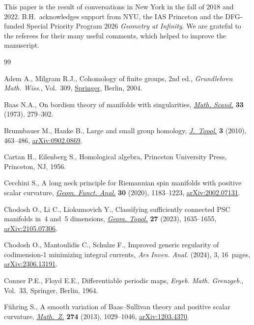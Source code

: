\documentclass[10pt,a4paper]{amsart}
\numberwithin{equation}{section}
\begin{document}
This paper is the result of conversations in New York in the fall of 2018 and 2022.
B.H.~acknowledges support from NYU, the IAS Princeton and the DFG-funded Special Priority Program 2026 {\em Geometry at Infinity}.
We are grateful to the referees for their many useful comments, which helped to improve the manuscript.


\begin{thebibliography}{99}
\footnotesize\itemsep=0pt

Adem A., Milgram R.J., Cohomology of finite groups, 2nd ed., \textit{Grundlehren Math.
 Wiss.}, Vol.~309, \href{https://doi.org/10.1007/978-3-662-06280-7}{Springer}, Berlin, 2004.

Baas N.A., On bordism theory of manifolds with singularities, \href{https://doi.org/10.7146/math.scand.a-11491}{\textit{Math.
 Scand.}} \textbf{33} (1973), 279--302.

Brunnbauer M., Hanke B., Large and small group homology, \href{https://doi.org/10.1112/jtopol/jtq014}{\textit{J.~Topol.}}
 \textbf{3} (2010), 463--486, \href{https://arxiv.org/abs/0902.0869}{arXiv:0902.0869}.

Cartan H., Eilenberg S., Homological algebra, Princeton University Press,
 Princeton, NJ, 1956.

Cecchini S., A long neck principle for {R}iemannian spin manifolds with
 positive scalar curvature, \href{https://doi.org/10.1007/s00039-020-00545-1}{\textit{Geom. Funct. Anal.}} \textbf{30} (2020),
 1183--1223, \href{https://arxiv.org/abs/2002.07131}{arXiv:2002.07131}.

Chodosh O., Li C., Liokumovich Y., Classifying sufficiently connected {PSC}
 manifolds in~4 and~5 dimensions,  \href{https://doi.org/10.2140/gt.2023.27.1635}{\textit{Geom. Topol.}} \textbf{27} (2023),
 1635--1655, \href{https://arxiv.org/abs/2105.07306}{arXiv:2105.07306}.

Chodosh O., Mantoulidis C., Schulze F., Improved generic regularity of
 codimension-1 minimizing integral currents, \textit{Ars Inven. Anal.}
 (2024), 3, 16~pages, \href{https://arxiv.org/abs/2306.13191}{arXiv:2306.13191}.

Conner P.E., Floyd E.E., Differentiable periodic maps, \textit{Ergeb. Math.
 Grenzgeb.}, Vol.~33, Springer, Berlin, 1964.

F\"uhring S., A smooth variation of {B}aas--{S}ullivan theory and positive
 scalar curvature, \href{https://doi.org/10.1007/s00209-012-1105-x}{\textit{Math.~Z.}} \textbf{274} (2013), 1029--1046,
 \href{https://arxiv.org/abs/1203.4370}{arXiv:1203.4370}.


\end{thebibliography}
\end{document}
